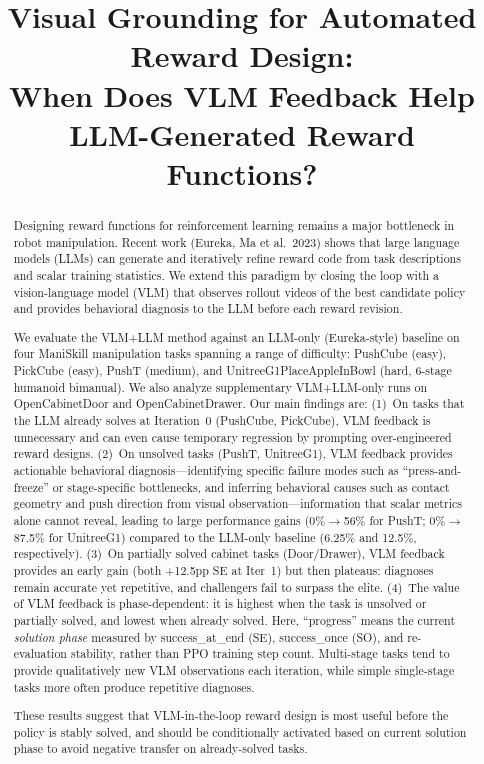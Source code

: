 \documentclass[conference]{IEEEtran}
\begin{document}
\title{Visual Grounding for Automated Reward Design:\\
When Does VLM Feedback Help LLM-Generated Reward Functions?}

\author{}

\maketitle

\begin{abstract}
Designing reward functions for reinforcement learning remains a major bottleneck
in robot manipulation. Recent work (Eureka, Ma et al.\ 2023) shows that large
language models (LLMs) can generate and iteratively refine reward code from task
descriptions and scalar training statistics. We extend this paradigm by closing
the loop with a vision-language model (VLM) that observes rollout videos of the
best candidate policy and provides behavioral diagnosis to the LLM before each
reward revision.

We evaluate the VLM+LLM method against an LLM-only (Eureka-style) baseline on
four ManiSkill manipulation tasks spanning a range of difficulty: PushCube
(easy), PickCube (easy), PushT (medium), and UnitreeG1PlaceAppleInBowl (hard,
6-stage humanoid bimanual). We also analyze supplementary VLM+LLM-only runs on
OpenCabinetDoor and OpenCabinetDrawer. Our main findings are:
(1)~On tasks that the LLM already solves at Iteration~0 (PushCube, PickCube),
VLM feedback is unnecessary and can even cause temporary regression by
prompting over-engineered reward designs.
(2)~On unsolved tasks (PushT, UnitreeG1), VLM feedback provides actionable
behavioral diagnosis---identifying specific failure modes such as
``press-and-freeze'' or stage-specific bottlenecks, and inferring behavioral
causes such as contact geometry and push direction from visual
observation---information that scalar metrics alone cannot reveal, leading to large performance gains (0\%$\to$56\% for PushT;
0\%$\to$87.5\% for UnitreeG1) compared to the LLM-only baseline (6.25\% and
12.5\%, respectively).
(3)~On partially solved cabinet tasks (Door/Drawer), VLM feedback provides an
early gain (both +12.5pp SE at Iter~1) but then plateaus: diagnoses remain
accurate yet repetitive, and challengers fail to surpass the elite.
(4)~The value of VLM feedback is phase-dependent: it is highest when the task is
unsolved or partially solved, and lowest when already solved. Here, ``progress''
means the current \emph{solution phase} measured by success\_at\_end (SE),
success\_once (SO), and re-evaluation stability, rather than PPO training step
count. Multi-stage tasks tend to provide qualitatively new VLM observations each
iteration, while simple single-stage tasks more often produce repetitive diagnoses.

These results suggest that VLM-in-the-loop reward design is most useful before
the policy is stably solved, and should be conditionally activated based on
current solution phase to avoid negative transfer on already-solved tasks.
\end{abstract}
\end{document}
